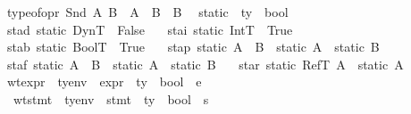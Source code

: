 \begin{isabellebody}
\ \ {\isachardoublequoteopen}typeof{\isacharunderscore}opr\ {\isacharparenleft}Snd\ A\ B{\isacharparenright}\ {\isacharequal}\ {\isacharparenleft}{\isacharparenleft}A\ {\isasymtimes}\ B{\isacharparenright}\ {\isasymrightarrow}\ B{\isacharparenright}{\isachardoublequoteclose}\ \isanewline
\isanewline
{}\isamarkupfalse \ static\ {\isacharcolon}{\isacharcolon}\ {\isachardoublequoteopen}ty\ {\isasymRightarrow}\ bool{\isachardoublequoteclose}\ \isanewline
\ \ sta{\isacharunderscore}d{\isacharcolon}\ {\isachardoublequoteopen}static\ DynT\ {\isacharequal}\ False{\isachardoublequoteclose}\ {\isacharbar}\isanewline
\ \ sta{\isacharunderscore}i{\isacharcolon}\ {\isachardoublequoteopen}static\ IntT\ {\isacharequal}\ True{\isachardoublequoteclose}\ {\isacharbar}\isanewline
\ \ sta{\isacharunderscore}b{\isacharcolon}\ {\isachardoublequoteopen}static\ BoolT\ {\isacharequal}\ True{\isachardoublequoteclose}\ {\isacharbar}\isanewline
\ \ sta{\isacharunderscore}p{\isacharcolon}\ {\isachardoublequoteopen}static\ {\isacharparenleft}A\ {\isasymtimes}\ B{\isacharparenright}\ {\isacharequal}\ {\isacharparenleft}static\ A\ {\isasymand}\ static\ B{\isacharparenright}{\isachardoublequoteclose}\ {\isacharbar}\isanewline
\ \ sta{\isacharunderscore}f{\isacharcolon}\ {\isachardoublequoteopen}static\ {\isacharparenleft}A\ {\isasymrightarrow}\ B{\isacharparenright}\ {\isacharequal}\ {\isacharparenleft}static\ A\ {\isasymand}\ static\ B{\isacharparenright}{\isachardoublequoteclose}\ {\isacharbar}\isanewline
\ \ sta{\isacharunderscore}r{\isacharcolon}\ {\isachardoublequoteopen}static\ {\isacharparenleft}RefT\ A{\isacharparenright}\ {\isacharequal}\ static\ A{\isachardoublequoteclose}\ \isanewline
\isanewline
{}\isamarkupfalse \isanewline
\ \ wt{\isacharunderscore}expr\ {\isacharcolon}{\isacharcolon}\ {\isachardoublequoteopen}ty{\isacharunderscore}env\ {\isasymRightarrow}\ expr\ {\isasymRightarrow}\ ty\ {\isasymRightarrow}\ bool{\isachardoublequoteclose}\ {\isacharparenleft}{\isachardoublequoteopen}{\isacharunderscore}\ {\isasymturnstile}\isactrlisub e\ {\isacharunderscore}\ {\isacharcolon}\ {\isacharunderscore}{\isachardoublequoteclose}\ {\isacharbrackleft}{}{}{\isacharcomma}{}{}{\isacharcomma}{}{}{\isacharbrackright}\ {}{}{\isacharparenright}\ \isanewline
\ \ \ wt{\isacharunderscore}stmt\ {\isacharcolon}{\isacharcolon}\ {\isachardoublequoteopen}ty{\isacharunderscore}env\ {\isasymRightarrow}\ stmt\ {\isasymRightarrow}\ ty\ {\isasymRightarrow}\ bool{\isachardoublequoteclose}\ {\isacharparenleft}{\isachardoublequoteopen}{\isacharunderscore}\ {\isasymturnstile}\isactrlisub s\ {\isacharunderscore}\ {\isacharcolon}\ {\isacharunderscore}{\isachardoublequoteclose}\ {\isacharbrackleft}{}{}{\isacharcomma}{}{}{\isacharcomma}{}{}{\isacharbrackright}\ {}{}{\isacharparenright}\ \isanewline

\end{isabellebody}
